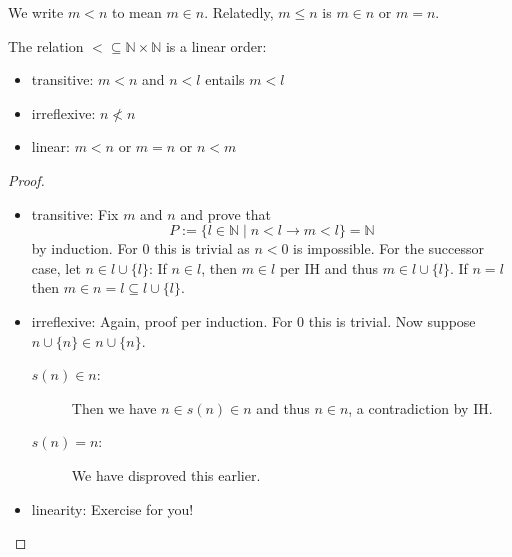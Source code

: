 \documentclass{whrartcl}
\newcommand{\NN}{\mathbb{N}}
\begin{document}
\begin{definition}
  We write $m < n$ to mean $m \in n$. Relatedly, $m \leq n$ is $m \in n$ or $m =
  n$.
\end{definition}

\begin{proposition}
  The relation $< \subseteq \NN \times \NN$ is a linear order:
  \begin{itemize}
  \item transitive: $m < n$ and $n < l$ entails $m < l$
  \item irreflexive: $n \not< n$
  \item linear: $m < n$ or $m = n$ or $n < m$
  \end{itemize}
\end{proposition}
\begin{proof}
  \
  \begin{itemize}
  \item transitive: Fix $m$ and $n$ and prove that
    \[
      P := \{l \in \NN \mid n < l \to m < l\} = \NN
    \]
    by induction. For $0$ this is trivial as $n < 0$ is impossible. For the
    successor case, let $n \in l \cup \{l\}$: If $n \in l$, then $m \in l$ per
    IH and thus $m \in l \cup \{l\}$. If $n = l$ then $m \in n = l \subseteq l
    \cup \{l\}$.
  \item irreflexive: Again, proof per induction. For $0$ this is trivial. Now
    suppose $n \cup \{n\} \in n \cup \{n\}$.
    \begin{description}
    \item[$s(n) \in n$:] Then we have $n \in s(n) \in n$ and thus $n \in n$, a
      contradiction by IH.
    \item[$s(n) = n$:] We have disproved this earlier.
    \end{description}
  \item linearity: Exercise for you!
  \end{itemize}
\end{proof}

\end{document}
